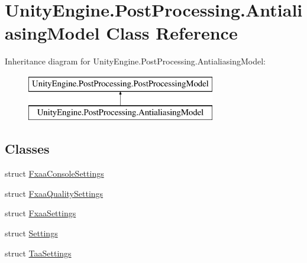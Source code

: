 \hypertarget{class_unity_engine_1_1_post_processing_1_1_antialiasing_model}{}\section{Unity\+Engine.\+Post\+Processing.\+Antialiasing\+Model Class Reference}
\label{class_unity_engine_1_1_post_processing_1_1_antialiasing_model}
Inheritance diagram for Unity\+Engine.\+Post\+Processing.\+Antialiasing\+Model\+:\begin{figure}[H]
\begin{center}
\leavevmode
\includegraphics[height=2.000000cm]{class_unity_engine_1_1_post_processing_1_1_antialiasing_model}
\end{center}
\end{figure}
\subsection*{Classes}
\begin{DoxyCompactItemize}
\item 
struct \hyperlink{struct_unity_engine_1_1_post_processing_1_1_antialiasing_model_1_1_fxaa_console_settings}{Fxaa\+Console\+Settings}
\item 
struct \hyperlink{struct_unity_engine_1_1_post_processing_1_1_antialiasing_model_1_1_fxaa_quality_settings}{Fxaa\+Quality\+Settings}
\item 
struct \hyperlink{struct_unity_engine_1_1_post_processing_1_1_antialiasing_model_1_1_fxaa_settings}{Fxaa\+Settings}
\item 
struct \hyperlink{struct_unity_engine_1_1_post_processing_1_1_antialiasing_model_1_1_settings}{Settings}
\item 
struct \hyperlink{struct_unity_engine_1_1_post_processing_1_1_antialiasing_model_1_1_taa_settings}{Taa\+Settings}
\end{DoxyCompactItemize}

